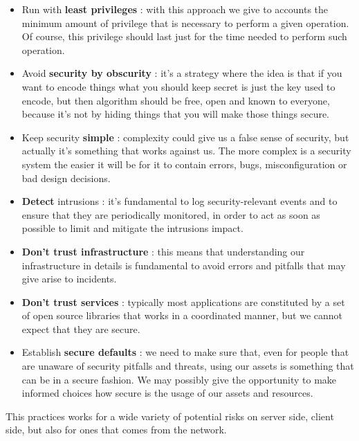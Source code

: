 \begin{itemize}
\begin{itemize}
\end{itemize}
\item Run with \textbf{least privileges} : with this approach we give to accounts the minimum amount of privilege that is necessary to perform a given operation. Of course, this privilege should last just for the time needed to perform such operation.
\item Avoid \textbf{security by obscurity} : it's a strategy where the idea is that if you want to encode things what you should keep secret is just the key used to encode, but then algorithm should be free, open and known to everyone, because it's not by hiding things that you will make those things secure.
\item Keep security \textbf{simple} : complexity could give us a false sense of security, but actually it's something that works against us. The more complex is a security system the easier it will be for it to contain errors, bugs, misconfiguration or bad design decisions.
\item \textbf{Detect} intrusions : it's fundamental to log security-relevant events and to ensure that they are periodically monitored, in order to act as soon as possible to limit and mitigate the intrusions impact.
\item \textbf{Don't trust infrastructure} : this means that understanding our infrastructure in details is fundamental to avoid errors and pitfalls that may give arise to incidents.
\item \textbf{Don't trust services} : typically most applications are constituted by a set of open source libraries that works in a coordinated manner, but we cannot expect that they are secure.
\item Establish \textbf{secure defaults} : we need to make sure that, even for people that are unaware of security pitfalls and threats, using our assets is something that can be in a secure fashion. We may possibly give the opportunity to make informed choices how secure is the usage of our assets and resources.
\end{itemize}
This practices works for a wide variety of potential risks on server side, client side, but also for ones that comes from the network.

